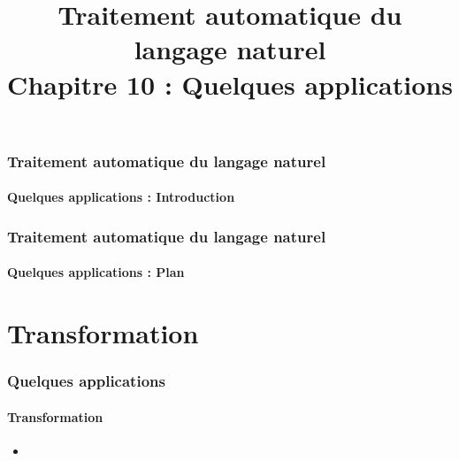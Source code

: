 \documentclass[xcolor=table]{beamer}
\title[TALN : 10- Quelques applications]%
{Traitement automatique du langage naturel\\Chapitre 10 : Quelques applications}
\begin{document}
	
\begin{frame}
\frametitle{Traitement automatique du langage naturel}
\framesubtitle{Quelques applications : Introduction}

%

\end{frame}

%
%

\begin{frame}
\frametitle{Traitement automatique du langage naturel}
\framesubtitle{Quelques applications : Plan}

\begin{multicols}{2}
\tableofcontents
\end{multicols}
\end{frame}

\section{Transformation}

\begin{frame}
	\frametitle{Quelques applications}
	\framesubtitle{Transformation}
	\begin{itemize}
		\item 
	\end{itemize}
\end{frame}
\end{document}
